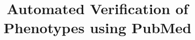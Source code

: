 \documentclass{sig-alternate}
\begin{document}
\title{Automated Verification of Phenotypes using PubMed}
%
%
%
%
%
\end{document}
